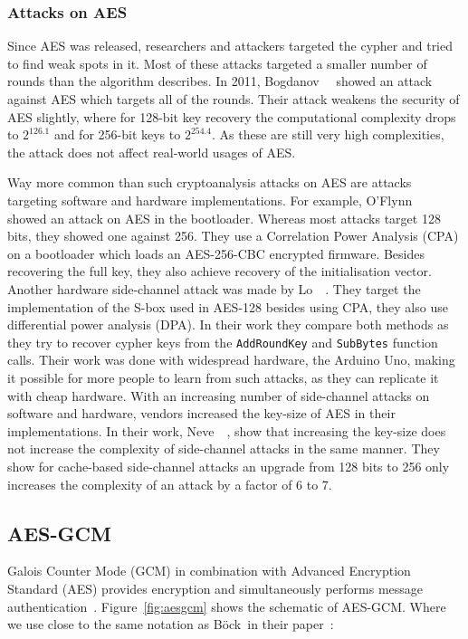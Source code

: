 \subsubsection{Attacks on AES}

Since AES was released, researchers and attackers targeted the cypher and tried
to find weak spots in it. Most of these attacks targeted a smaller number of
rounds than the algorithm describes. In 2011, Bogdanov~\etal~\cite{bicliqueaes}
showed an attack against AES which targets all of the rounds. Their attack
weakens the security of AES slightly, where for 128-bit key recovery the
computational complexity drops to $2^{126.1}$ and for 256-bit keys to
$2^{254.4}$. As these are still very high complexities, the attack does not
affect real-world usages of AES.

Way more common than such cryptoanalysis attacks on AES are attacks targeting
software and hardware implementations. For example,
O'Flynn~\etal~\cite{aespowerboot} showed an attack on AES in the bootloader.
Whereas most attacks target 128 bits, they showed one against 256. They use a
Correlation Power Analysis (CPA) on a bootloader which loads an AES-256-CBC
encrypted firmware. Besides recovering the full key, they also achieve recovery
of the initialisation vector. Another hardware side-channel attack was made by
Lo~\etal~\cite{sboxpoweranal}. They target the implementation of the S-box used
in AES-128 besides using CPA, they also use differential power analysis (DPA).
In their work they compare both methods as they try to recover cypher keys from
the \texttt{AddRoundKey} and \texttt{SubBytes} function calls. Their work was
done with widespread hardware, the Arduino Uno, making it possible for more
people to learn from such attacks, as they can replicate it with cheap
hardware. With an increasing number of side-channel attacks on software and
hardware, vendors increased the key-size of AES in their implementations. In
their work, Neve~\etal~\cite{sidecomplex}, show that increasing the key-size
does not increase the complexity of side-channel attacks in the same manner.
They show for cache-based side-channel attacks an upgrade from 128 bits to 256
only increases the complexity of an attack by a factor of 6 to 7.

\subsection{AES-GCM}

Galois Counter Mode (GCM) in combination with Advanced Encryption Standard (AES)
provides encryption and simultaneously performs message
authentication~\cite{gcm, gcmnist}. Figure~\ref{fig:aesgcm} shows the schematic
of AES-GCM. Where we use close to the same notation as Böck~\etal in their
paper~\cite{gcmnonceattack}:

